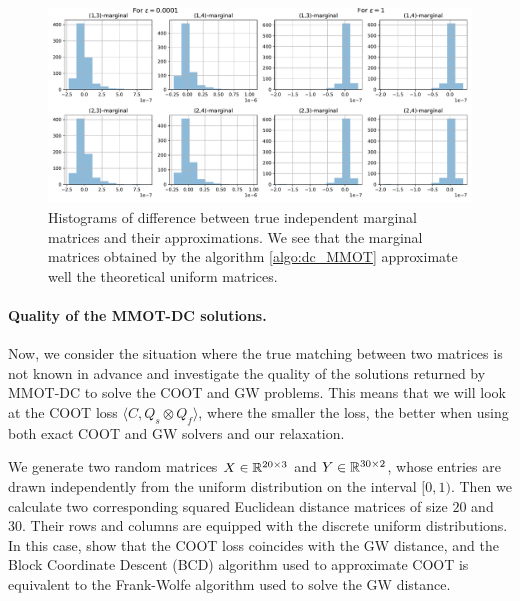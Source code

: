 \begin{figure}[t]
  \centering
  \includegraphics[width=1.\textwidth,height=1.\textheight,keepaspectratio]{./Chapitre2/fig/other_marginals.pdf}
  \caption{Histograms of difference between true independent marginal matrices and their approximations. We see that the marginal matrices obtained
  by the algorithm \ref{algo:dc_MMOT} approximate well the theoretical uniform matrices.}
  \label{fig:other_marg}
\end{figure}

\paragraph{Quality of the MMOT-DC solutions. \label{expe:2}}


Now, we consider the situation where the true matching between two matrices is not known in advance and investigate the quality
of the solutions returned by MMOT-DC to solve the COOT and GW problems. This means that we will look at the COOT loss
$\langle C, Q_s \otimes Q_f \rangle$, where the smaller the loss, the better when using both exact COOT and GW solvers
and our relaxation.

We generate two random matrices $X \in \mathbb R^{20 \times 3}$ and $Y \in \mathbb R^{30 \times 2}$,
whose entries are drawn independently from the uniform distribution on the interval $[0,1)$. Then we calculate two corresponding
squared Euclidean distance matrices of size $20$ and $30$. Their rows and columns are equipped with the discrete
uniform distributions. In this case, \citep{Redko20} show that the COOT loss coincides with the GW distance, and the
Block Coordinate Descent (BCD) algorithm used to approximate COOT is equivalent to the Frank-Wolfe algorithm \citep{Frank56}
used to solve the GW distance.

